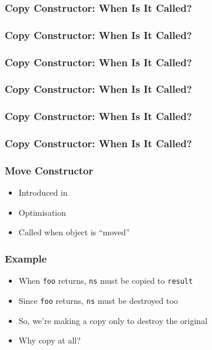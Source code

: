 \begin{frame}
  \frametitle{Copy Constructor: When Is It Called?}
\end{frame}

\begin{frame}
  \frametitle{Copy Constructor: When Is It Called?}
\end{frame}

\begin{frame}
  \frametitle{Copy Constructor: When Is It Called?}
\end{frame}

\begin{frame}
  \frametitle{Copy Constructor: When Is It Called?}
\end{frame}

\begin{frame}
  \frametitle{Copy Constructor: When Is It Called?}
\end{frame}

\begin{frame}
  \frametitle{Copy Constructor: When Is It Called?}
\end{frame}

\begin{frame}
  \frametitle{Move Constructor}
  \begin{itemize}
    \item Introduced in 
    \item Optimisation
    \item Called when object is ``moved''
  \end{itemize}
\end{frame}

\begin{frame}
  \frametitle{Example}
  \begin{itemize}
    \item When {\tt foo} returns, {\tt ns} must be copied to {\tt result}
    \item Since {\tt foo} returns, {\tt ns} must be destroyed too
    \item So, we're making a copy only to destroy the original
    \item Why copy at all?
  \end{itemize}
\end{frame}

